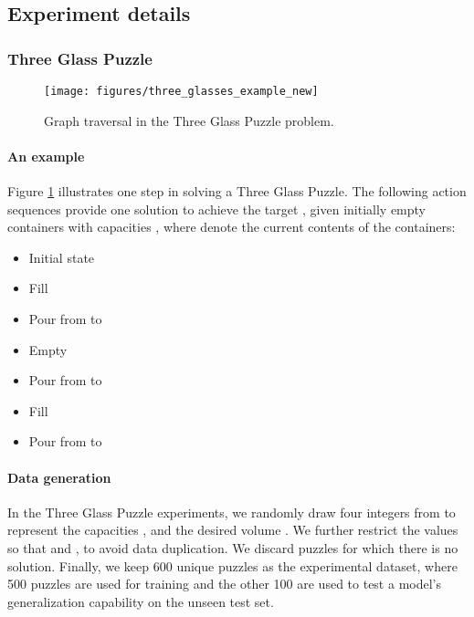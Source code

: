 \documentclass{article}
\begin{document}
\subsection{Experiment details}
\label{Appendix:exp_details}

\subsubsection{Three Glass Puzzle}


	\begin{figure}[h!]
		\centering
		\texttt{[image: figures/three\_glasses\_example\_new]}
		\caption{Graph traversal in the Three Glass Puzzle problem.}
		\label{fig:reorder_a}
	\end{figure}

\paragraph{An example} Figure \ref{fig:reorder_a} illustrates one step in solving a Three Glass Puzzle. 
	The following action sequences provide one solution to achieve the target , given initially empty containers with capacities  , where  denote the current contents of the containers:
	\begin{itemize}
		\item  {Initial state}   
		\item  {Fill }  
		\item  {Pour from  to }  
		\item  {Empty }  
    	\item  {Pour from  to }  
		\item  {Fill }  
		\item  {Pour from  to } 
	\end{itemize}


\paragraph{Data generation} In the Three Glass Puzzle experiments, we randomly draw four integers from  to represent the capacities , and the desired volume . 
We further restrict the values so that  and , to avoid data duplication. We discard puzzles for which there is no solution. Finally, we keep 600 unique puzzles as the experimental dataset, where 500 puzzles are used for training and the other 100 are used to test a model's generalization capability on the unseen test set.
\end{document}
